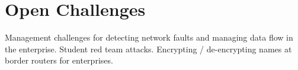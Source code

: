 \section{Open Challenges}

Management challenges for detecting network faults and managing data flow in the enterprise. 
Student red team attacks. 
Encrypting / de-encrypting names at border routers for enterprises. 
